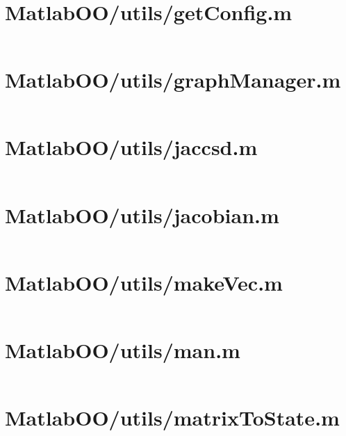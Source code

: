 \pagebreak
\section{MatlabOO/utils/getConfig.m}\label{code:MatlabOO/utils/getConfig.m}
\inputminted[linenos,fontsize=\scriptsize]{matlab}{/home/dcouture/git/mathyourlife/TSatPy/beta_versions/matlab_object_oriented/utils/getConfig.m}

\pagebreak
\section{MatlabOO/utils/graphManager.m}\label{code:MatlabOO/utils/graphManager.m}
\inputminted[linenos,fontsize=\scriptsize]{matlab}{/home/dcouture/git/mathyourlife/TSatPy/beta_versions/matlab_object_oriented/utils/graphManager.m}

\pagebreak
\section{MatlabOO/utils/jaccsd.m}\label{code:MatlabOO/utils/jaccsd.m}
\inputminted[linenos,fontsize=\scriptsize]{matlab}{/home/dcouture/git/mathyourlife/TSatPy/beta_versions/matlab_object_oriented/utils/jaccsd.m}

\pagebreak
\section{MatlabOO/utils/jacobian.m}\label{code:MatlabOO/utils/jacobian.m}
\inputminted[linenos,fontsize=\scriptsize]{matlab}{/home/dcouture/git/mathyourlife/TSatPy/beta_versions/matlab_object_oriented/utils/jacobian.m}

\pagebreak
\section{MatlabOO/utils/makeVec.m}\label{code:MatlabOO/utils/makeVec.m}
\inputminted[linenos,fontsize=\scriptsize]{matlab}{/home/dcouture/git/mathyourlife/TSatPy/beta_versions/matlab_object_oriented/utils/makeVec.m}

\pagebreak
\section{MatlabOO/utils/man.m}\label{code:MatlabOO/utils/man.m}
\inputminted[linenos,fontsize=\scriptsize]{matlab}{/home/dcouture/git/mathyourlife/TSatPy/beta_versions/matlab_object_oriented/utils/man.m}

\pagebreak
\section{MatlabOO/utils/matrixToState.m}\label{code:MatlabOO/utils/matrixToState.m}
\inputminted[linenos,fontsize=\scriptsize]{matlab}{/home/dcouture/git/mathyourlife/TSatPy/beta_versions/matlab_object_oriented/utils/matrixToState.m}

